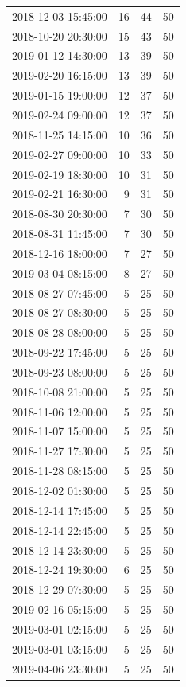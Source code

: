 \begin{tabular}{lrrr}
2018-12-03 15:45:00 & 16 & 44 & 50 \\
2018-10-20 20:30:00 & 15 & 43 & 50 \\
2019-01-12 14:30:00 & 13 & 39 & 50 \\
2019-02-20 16:15:00 & 13 & 39 & 50 \\
2019-01-15 19:00:00 & 12 & 37 & 50 \\
2019-02-24 09:00:00 & 12 & 37 & 50 \\
2018-11-25 14:15:00 & 10 & 36 & 50 \\
2019-02-27 09:00:00 & 10 & 33 & 50 \\
2019-02-19 18:30:00 & 10 & 31 & 50 \\
2019-02-21 16:30:00 & 9 & 31 & 50 \\
2018-08-30 20:30:00 & 7 & 30 & 50 \\
2018-08-31 11:45:00 & 7 & 30 & 50 \\
2018-12-16 18:00:00 & 7 & 27 & 50 \\
2019-03-04 08:15:00 & 8 & 27 & 50 \\
2018-08-27 07:45:00 & 5 & 25 & 50 \\
2018-08-27 08:30:00 & 5 & 25 & 50 \\
2018-08-28 08:00:00 & 5 & 25 & 50 \\
2018-09-22 17:45:00 & 5 & 25 & 50 \\
2018-09-23 08:00:00 & 5 & 25 & 50 \\
2018-10-08 21:00:00 & 5 & 25 & 50 \\
2018-11-06 12:00:00 & 5 & 25 & 50 \\
2018-11-07 15:00:00 & 5 & 25 & 50 \\
2018-11-27 17:30:00 & 5 & 25 & 50 \\
2018-11-28 08:15:00 & 5 & 25 & 50 \\
2018-12-02 01:30:00 & 5 & 25 & 50 \\
2018-12-14 17:45:00 & 5 & 25 & 50 \\
2018-12-14 22:45:00 & 5 & 25 & 50 \\
2018-12-14 23:30:00 & 5 & 25 & 50 \\
2018-12-24 19:30:00 & 6 & 25 & 50 \\
2018-12-29 07:30:00 & 5 & 25 & 50 \\
2019-02-16 05:15:00 & 5 & 25 & 50 \\
2019-03-01 02:15:00 & 5 & 25 & 50 \\
2019-03-01 03:15:00 & 5 & 25 & 50 \\
2019-04-06 23:30:00 & 5 & 25 & 50 \\

\end{tabular}
